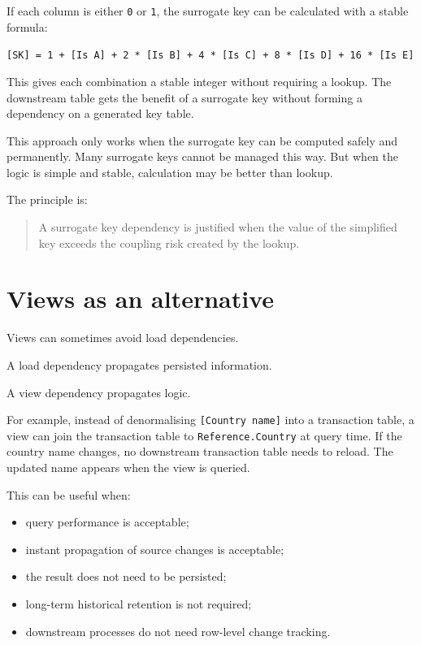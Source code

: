 \documentclass[10pt,openany,10pt]{book}
\providecommand{\tightlist}{%
  \setlength{\itemsep}{0pt}\setlength{\parskip}{0pt}}
\begin{document}
If each column is either \texttt{0} or \texttt{1}, the surrogate key can
be calculated with a stable formula:

\texttt{{[}SK{]}\ =\ 1\ +\ {[}Is\ A{]}\ +\ 2\ *\ {[}Is\ B{]}\ +\ 4\ *\ {[}Is\ C{]}\ +\ 8\ *\ {[}Is\ D{]}\ +\ 16\ *\ {[}Is\ E{]}}

This gives each combination a stable integer without requiring a lookup.
The downstream table gets the benefit of a surrogate key without forming
a dependency on a generated key table.

This approach only works when the surrogate key can be computed safely
and permanently. Many surrogate keys cannot be managed this way. But
when the logic is simple and stable, calculation may be better than
lookup.

The principle is:

\begin{quote}
A surrogate key dependency is justified when the value of the simplified
key exceeds the coupling risk created by the lookup.
\end{quote}

\section{Views as an alternative}\label{views-as-an-alternative}

Views can sometimes avoid load dependencies.

A load dependency propagates persisted information.

A view dependency propagates logic.

For example, instead of denormalising \texttt{{[}Country\ name{]}} into
a transaction table, a view can join the transaction table to
\texttt{Reference.Country} at query time. If the country name changes,
no downstream transaction table needs to reload. The updated name
appears when the view is queried.

This can be useful when:

\begin{itemize}
\tightlist
\item
  query performance is acceptable;
\item
  instant propagation of source changes is acceptable;
\item
  the result does not need to be persisted;
\item
  long-term historical retention is not required;
\item
  downstream processes do not need row-level change tracking.
\end{itemize}
\end{document}
